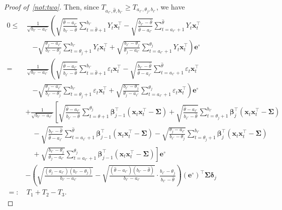 \documentclass[11pt, a4paper]{article}
\newcommand{\mbf}{\mathbf}
\newcommand{\vep}{\varepsilon}
\renewcommand{\l}{\left}
\renewcommand{\r}{\right}
\def\wh{\widehat}
\newcommand{\cp}{\theta}
\newcommand{\nn}{\nonumber}
\theoremstyle{definition}
\theoremstyle{definition}
\theoremstyle{definition}
\theoremstyle{definition}
\theoremstyle{definition}
\theoremstyle{remark}
\theoremstyle{definition}
\theoremstyle{definition}
\theoremstyle{definition}
\begin{document}
\begin{proof}[Proof of~\ref{not:two}]
	Then, since $T_{a_{\ell^\circ}, \wh\cp, b_{\ell^\circ}} \ge T_{a_{\ell^\circ}, \cp_j, b_{\ell^\circ}}$, we have
	\begin{align}
	0 \le& \, \frac{1}{\sqrt{b_{\ell^\circ} - a_{\ell^\circ}}} \l( \sqrt{\frac{\wh\cp - a_{\ell^\circ}}{b_{\ell^\circ} - \wh\cp}} \sum_{t = \wh\cp + 1}^{b_{\ell^\circ}} Y_t \mbf x_t^\top -
	\sqrt{\frac{b_{\ell^\circ} - \wh\cp}{\wh\cp - a_{\ell^\circ}}} \sum_{t = a_{\ell^\circ} + 1}^{\wh\cp} Y_t \mbf x_t^\top \r. 
	\nn \\
	& \quad \l. - \sqrt{\frac{\cp_j - a_{\ell^\circ}}{b_{\ell^\circ} - \cp_j}} \sum_{t = \cp_j + 1}^{b_{\ell^\circ}} Y_t \mbf x_t^\top +
	\sqrt{\frac{b_{\ell^\circ} - \cp_j}{\cp_j - a_{\ell^\circ}}} \sum_{t = a_{\ell^\circ} + 1}^{\cp_j} Y_t \mbf x_t^\top \r) \mbf e^\circ 
	\nn \\
	=& \, \frac{1}{\sqrt{b_{\ell^\circ} - a_{\ell^\circ}}} \l( \sqrt{\frac{\wh\cp - a_{\ell^\circ}}{b_{\ell^\circ} - \wh\cp}} \sum_{t = \wh\cp + 1}^{b_{\ell^\circ}} \vep_t \mbf x_t^\top -
	\sqrt{\frac{b_{\ell^\circ} - \wh\cp}{\wh\cp - a_{\ell^\circ}}} \sum_{t = a_{\ell^\circ} + 1}^{\wh\cp} \vep_t \mbf x_t^\top \r. 
	\nn \\ 
	& \quad \l. - \sqrt{\frac{\cp_j - a_{\ell^\circ}}{b_{\ell^\circ} - \cp_j}} \sum_{t = \cp_j + 1}^{b_{\ell^\circ}} \vep_t \mbf x_t^\top +
	\sqrt{\frac{b_{\ell^\circ} - \cp_j}{\cp_j - a_{\ell^\circ}}} \sum_{t = a_{\ell^\circ} + 1}^{\cp_j} \vep_t \mbf x_t^\top \r) \mbf e^\circ 
	\nn \\
	& + \frac{1}{\sqrt{b_{\ell^\circ} - a_{\ell^\circ}}} \l[ \sqrt{\frac{\wh\cp - a_{\ell^\circ}}{b_{\ell^\circ} - \wh\cp}} \sum_{t = \wh\cp + 1}^{\cp_j} \bm\beta_{j - 1}^\top \l( \mbf x_t \mbf x_t^\top - \bm\Sigma \r) + 
	\sqrt{\frac{\wh\cp - a_{\ell^\circ}}{b_{\ell^\circ} - \wh\cp}} \sum_{t = \cp_j + 1}^{b_{\ell^\circ}} \bm\beta_j^\top \l( \mbf x_t \mbf x_t^\top - \bm\Sigma \r) \r.
	\nn \\
	& \quad - \sqrt{\frac{b_{\ell^\circ} - \wh\cp}{\wh\cp - a_{\ell^\circ}}} \sum_{t = a_{\ell^\circ} + 1}^{\wh\cp} \bm\beta_{j - 1}^\top \l( \mbf x_t \mbf x_t^\top - \bm\Sigma \r) -
	\sqrt{\frac{\cp_j - a_{\ell^\circ}}{b_{\ell^\circ} - \cp_j}} \sum_{t = \cp_j + 1}^{b_{\ell^\circ}} \bm\beta_j^\top \l( \mbf x_t \mbf x_t^\top - \bm\Sigma \r) 
	\nn \\ 
	& \quad + \l. \sqrt{\frac{b_{\ell^\circ} - \cp_j}{\cp_j - a_{\ell^\circ}}} \sum_{t = a_{\ell^\circ} + 1}^{\cp_j} \bm\beta_{j - 1}^\top \l( \mbf x_t \mbf x_t^\top - \bm\Sigma \r) \r] \mbf e^\circ 
	\nn \\
	& - \l(\sqrt{\frac{(\cp_j - a_{\ell^\circ})(b_{\ell^\circ} - \cp_j) }{b_{\ell^\circ} - a_{\ell^\circ}}} - \sqrt{\frac{(\wh\cp - a_{\ell^\circ})(b_{\ell^\circ} - \wh\cp) }{b_{\ell^\circ} - a_{\ell^\circ}}} \cdot \frac{b_{\ell^\circ} - \cp_j}{b_{\ell^\circ} - \wh\cp} \r) (\mbf e^\circ)^\top \bm\Sigma \bm\delta_j
	\nn \\
	=:& \, T_1 + T_2 - T_3.
	\label{eq:r:ineq}
	\end{align}
	

\end{proof}
\end{document}
